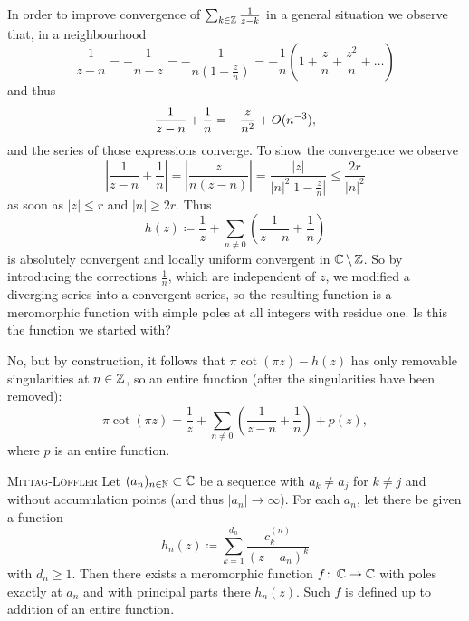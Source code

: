 \documentclass[a4paper,english]{article}
\begin{document}
\begin{exampleB}
    In order to improve convergence of $\sum_{k \in \operatorname{\mathbb{Z}}} \frac{1}{z - k}$ in a general situation we observe that, in a neighbourhood
    \begin{equation*}
        \frac{1}{z - n}
        = - \frac{1}{n - z}
        = - \frac{1}{n \left(1 - \frac{z}{n}\right)}
        = - \frac{1}{n} \left( 1 + \frac{z}{n} + \frac{z^2}{n} + \ldots \right)
    \end{equation*}
    and thus
    \begin{equation*}
        \frac{1}{z - n} + \frac{1}{n}
        = - \frac{z}{n^2} + O(n^{-3}),
    \end{equation*}
    and the series of those expressions converge.
    To show the convergence we observe
    \begin{equation*}
        \left| \frac{1}{z - n} + \frac{1}{n} \right|
        = \left| \frac{z}{n (z - n)} \right|
        = \frac{| z |}{| n |^2 \left| 1 - \frac{z}{n}\right|}
        \le \frac{2 r}{| n |^2}
    \end{equation*}
    as soon as $| z | \le r$ and $| n | \ge 2 r$.
    Thus
    \begin{equation*}
        h(z)
        \coloneqq \frac{1}{z} + \sum_{n \ne 0} \left(\frac{1}{z - n} + \frac{1}{n}\right)
    \end{equation*}
    is absolutely convergent and locally uniform convergent in $\operatorname{\mathbb{C}} \setminus \operatorname{\mathbb{Z}}$.
    So by introducing the corrections $\frac{1}{n}$, which are independent of $z$, we modified a diverging series into a convergent series, so the resulting function is a meromorphic function with simple poles at all integers with residue one.
    Is this the function we started with?
    
    No, but by construction, it follows that $\pi \cot(\pi z) - h(z)$ has only removable singularities at $n \in \operatorname{\mathbb{Z}}$, so an entire function (after the singularities have been removed):
    \begin{equation*}
        \pi \cot(\pi z)
        = \frac{1}{z} + \sum_{n \ne 0} \left(\frac{1}{z - n} + \frac{1}{n}\right) + p(z),
    \end{equation*}
    where $p$ is an entire function.
\end{exampleB}

\begin{thm}{\textsc{Mittag-Löffler}}{}
    Let $(a_n)_{n \in \operatorname{\mathbb{N}}} \subset \operatorname{\mathbb{C}}$ be a sequence with $a_k \ne a_j$ for $k \ne j$ and without accumulation points (and thus $| a_n | \to \infty$).
    For each $a_n$, let there be given a function
    \begin{equation*}
        h_n(z)
        \coloneqq \sum_{k = 1}^{d_n} \frac{c_k^{(n)}}{(z - a_n)^k}
    \end{equation*}
    with $d_n \ge 1$.
    Then there exists a meromorphic function $f \colon \operatorname{\mathbb{C}} \to \operatorname{\mathbb{C}}$ with poles exactly at $a_n$ and with principal parts there $h_n(z)$.
    Such $f$ is defined up to addition of an entire function.
\end{thm}
\end{document}
